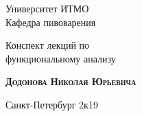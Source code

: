 \begin{titlepage}
    \newpage
    
    \begin{center}
    \LARGE Университет ИТМО \\
    \vspace{1cm}
    \normalsize Кафедра пивоварения \\
    \hrulefill
    \end{center}
     
    
    \vspace{8em}
    
    \begin{center}
    \huge Конспект лекций по \\ функциональному анализу
    \end{center}
    
    \vspace{2.5em}
     
    \begin{center}
    \textsc{\textbf{Додонова Николая Юрьевича}}
    \end{center}
    
    \vspace{6em}
     
    
     
    \vspace{\fill}
    
    \begin{center}
    Санкт-Петербург 2к19 
    \end{center}
    
\end{titlepage}